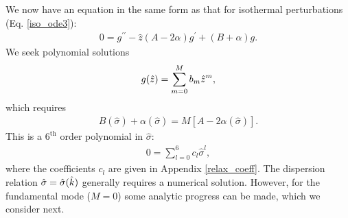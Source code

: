 We now have an equation in the same form as that for isothermal
perturbations (Eq. \ref{iso_ode3}):
\begin{align}
  0 = g^{\prime\prime} - \hat{z}\left(A - 2\alpha\right)g^\prime +
  \left(B + \alpha\right)g.
\end{align}
We seek polynomial solutions 
\begin{align}
  g(\hat{z}) = \sum_{m=0}^M b_m \hat{z}^m,
\end{align}
which requires
\begin{align}
  B(\hat{\sigma}) + \alpha(\hat{\sigma}) =
  M\left[A-2\alpha(\hat{\sigma})\right].\label{adia_disp0} 
\end{align}
This is a $6^\mathrm{th}$ order 
polynomial in $\hat{\sigma}$:  
\begin{align}
  0 = \sum_{l=0}^{6}c_l\hat{\sigma}^l,\label{relax_disp}
\end{align}
where the coefficients $c_l$ are given in Appendix \ref{relax_coeff}.
The dispersion relation $\hat{\sigma}=\hat{\sigma}(\hat{k})$ generally
requires a numerical solution. However, for the fundamental mode
($M=0$) some analytic progress can be made, which we consider next.  



